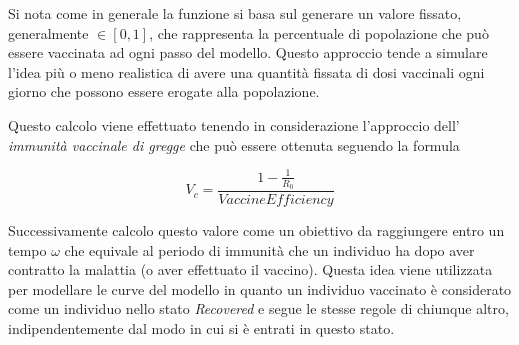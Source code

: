 Si nota come in generale la funzione si basa sul generare un valore fissato, 
generalmente $\in [0,1]$, che rappresenta la percentuale di popolazione che può 
essere vaccinata ad ogni passo del modello. Questo approccio tende a simulare l'idea 
più o meno realistica di avere una quantità fissata di dosi vaccinali 
ogni giorno che possono essere erogate alla popolazione. 

Questo calcolo viene effettuato tenendo in considerazione l'approccio 
dell' \emph{immunità vaccinale di gregge} \cite{wiki:Immunità_di_gregge} 
che può essere ottenuta seguendo la formula 

$$V_c = \frac{1-\frac{1}{R_0}}{VaccineEfficiency}$$

Successivamente calcolo questo valore come un obiettivo da raggiungere entro un tempo $\omega$ 
che equivale al periodo di immunità che un individuo ha dopo aver contratto la malattia 
(o aver effettuato il vaccino). Questa idea viene utilizzata per modellare le curve del 
modello in quanto un individuo vaccinato è considerato come un individuo nello stato 
\emph{Recovered} e segue le stesse regole di chiunque altro, indipendentemente
dal modo in cui si è entrati in questo stato. 

